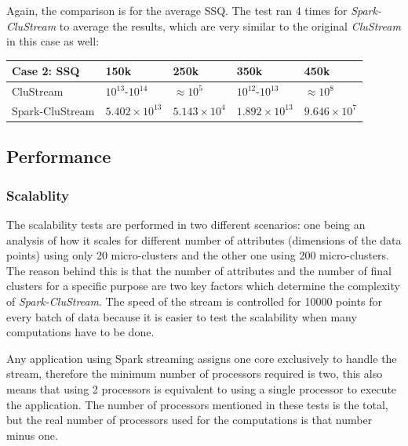 \documentclass{llncs}
\begin{document}
Again, the comparison is for the average SSQ. The test ran 4 times for \textit{Spark-CluStream} to average the results, which are very similar to the original \textit{CluStream} in this case as well:

\begin{center}
\begin{tabular}{|l|l|l|l|l|}\hline
\textbf{Case 2: SSQ} & \textbf{150k} & \textbf{250k} & \textbf{350k} & \textbf{450k}\\\hline
CluStream & $10^{13}$-$10^{14}$ & $\approx 10^{5}$ & $10^{12}$-$10^{13}$ & $\approx 10^{8}$\\\hline
Spark-CluStream & $5.402\times10^{13}$ & $5.143\times10^{4}$ & $1.892\times10^{13}$ & $9.646\times10^7$\\\hline
\end{tabular}
\end{center}


\subsection{Performance}


\subsubsection{Scalablity}

The scalability tests are performed in two different scenarios: one being an analysis of how it scales for different number of attributes (dimensions of the data points) using only 20 micro-clusters and the other one using 200 micro-clusters. The reason behind this is that the number of attributes and the number of final clusters for a specific purpose are two key factors which determine the complexity of \textit{Spark-CluStream}. The speed of the stream is controlled for 10000 points for every batch of data because it is easier to test the scalability when many computations have to be done.

Any application using Spark streaming assigns one core exclusively to handle the stream, therefore the minimum number of processors required is two, this also means that using 2 processors is equivalent to using a single processor to execute the application. The number of processors mentioned in these tests is the total, but the real number of processors used for the computations is that number minus one.
\end{document}
